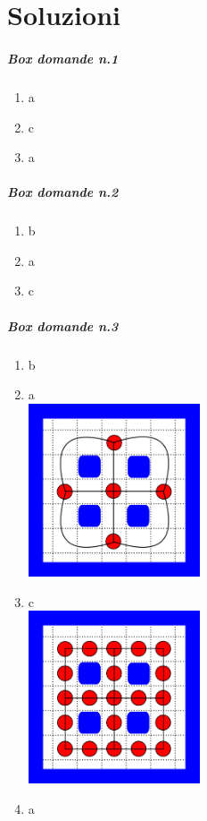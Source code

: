 \documentclass[8pt]{book}
\begin{document}
\chapter{Soluzioni}

\paragraph{Box domande n.1}\label{box-domande-n.1}

\begin{enumerate}
\item
  a
\item
  c
\item
  a
\end{enumerate}

\paragraph{Box domande n.2}\label{box-domande-n.2}

\begin{enumerate}
\item
  b
\item
  a
\item
  c
\end{enumerate}

\paragraph{Box domande n.3}\label{box-domande-n.3}

\begin{enumerate}
\item
  b
\item
  a\\
  \includegraphics[width=0.40000\textwidth]{img/num_VerticiArchi_es_sol1.png}
\item
  c\\
  \includegraphics[width=0.40000\textwidth]{img/num_VerticiArchi_es_sol2.png}
\item
  a
\end{enumerate}
\end{document}
